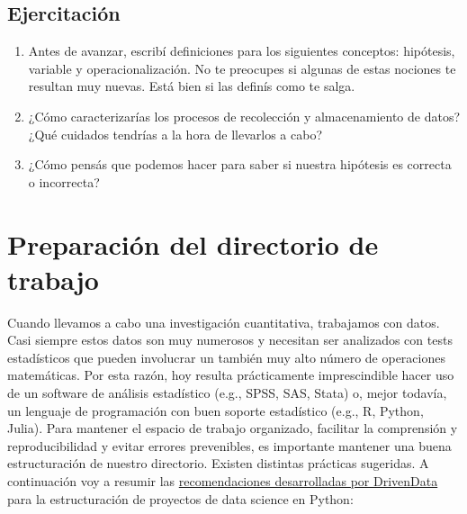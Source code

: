 \documentclass[12pt,spanish,a4paper,]{article}
\providecommand{\tightlist}{%
  \setlength{\itemsep}{0pt}\setlength{\parskip}{0pt}}
\begin{document}
\hypertarget{ejercitacion}{%
\subsection{Ejercitación}\label{ejercitacion}}

\begin{enumerate}
\def\labelenumi{\arabic{enumi}.}
\tightlist
\item
  Antes de avanzar, escribí definiciones para los siguientes conceptos:
  hipótesis, variable y operacionalización. No te preocupes si algunas
  de estas nociones te resultan muy nuevas. Está bien si las definís
  como te salga.
\item
  ¿Cómo caracterizarías los procesos de recolección y almacenamiento de
  datos? ¿Qué cuidados tendrías a la hora de llevarlos a cabo?
\item
  ¿Cómo pensás que podemos hacer para saber si nuestra hipótesis es
  correcta o incorrecta?
\end{enumerate}

\hypertarget{preparacion-del-directorio-de-trabajo}{%
\section{Preparación del directorio de
trabajo}\label{preparacion-del-directorio-de-trabajo}}

Cuando llevamos a cabo una investigación cuantitativa, trabajamos con
datos. Casi siempre estos datos son muy numerosos y necesitan ser
analizados con tests estadísticos que pueden involucrar un también muy
alto número de operaciones matemáticas. Por esta razón, hoy resulta
prácticamente imprescindible hacer uso de un software de análisis
estadístico (e.g., SPSS, SAS, Stata) o, mejor todavía, un lenguaje de
programación con buen soporte estadístico (e.g., R, Python, Julia). Para
mantener el espacio de trabajo organizado, facilitar la comprensión y
reproducibilidad y evitar errores prevenibles, es importante mantener
una buena estructuración de nuestro directorio. Existen distintas
prácticas sugeridas. A continuación voy a resumir las
\href{https://drivendata.github.io/cookiecutter-data-science/}{recomendaciones
desarrolladas por DrivenData} para la estructuración de proyectos de
data science en Python:
\end{document}
